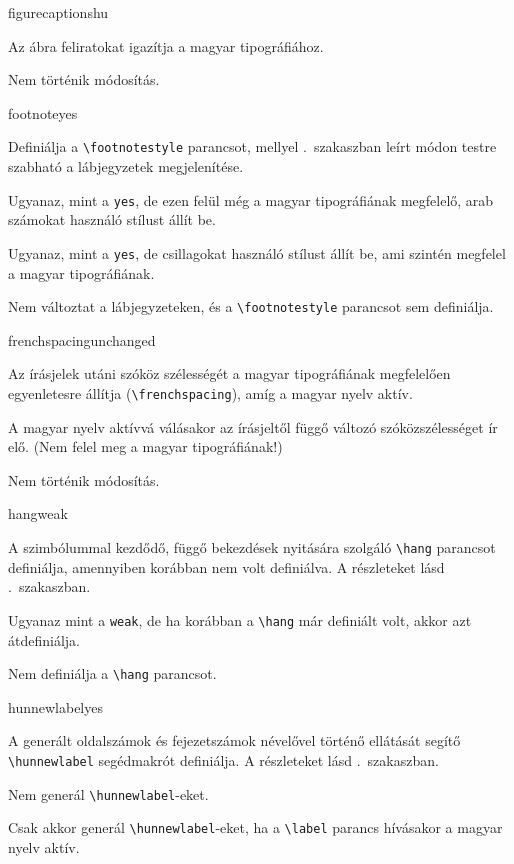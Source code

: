 \documentclass[12pt]{article}
\begin{document}
\begin{description}
\begin{hunopt}{figurecaptions}{hu}
\item[hu]
Az ábra feliratokat igazítja a magyar tipográfiához.
\item[unchanged]
Nem történik módosítás.
\end{hunopt}

\begin{hunopt}{footnote}{yes}
\item[yes]
Definiálja a \verb|\footnotestyle| parancsot, mellyel .~szakaszban leírt módon testre szabható a lábjegyzetek megjelenítése.
\item[huplain]
Ugyanaz, mint a \texttt{yes}, de ezen felül még a magyar tipográfiának megfelelő, arab számokat használó stílust állít be.
\item[starplain]
Ugyanaz, mint a \texttt{yes}, de csillagokat használó stílust állít be, ami szintén megfelel a magyar tipográfiának.
\item[unchanged]
Nem változtat a lábjegyzeteken, és a \verb|\footnotestyle| parancsot sem definiálja.
\end{hunopt}

\begin{hunopt}{frenchspacing}{unchanged}
\item[yes]
Az írásjelek utáni szóköz szélességét a magyar tipográfiának megfelelően egyenletesre állítja (\verb|\frenchspacing|), amíg a magyar nyelv aktív.
\item[no]
A magyar nyelv aktívvá válásakor az írásjeltől függő változó szóközszélességet ír elő. (Nem felel meg a magyar tipográfiának!)
\item[unchanged]
Nem történik módosítás.
\end{hunopt}

\begin{hunopt}{hang}{weak}
\item[weak]
A szimbólummal kezdődő, függő bekezdések nyitására szolgáló \verb|\hang| parancsot definiálja, amennyiben korábban nem volt definiálva.
A részleteket lásd .~szakaszban.
\item[yes]
Ugyanaz mint a \texttt{weak}, de ha korábban a \verb|\hang| már definiált volt, akkor azt átdefiniálja.
\item[no]
Nem definiálja a \verb|\hang| parancsot.
\end{hunopt}

\begin{hunopt}{hunnewlabel}{yes}
\item[yes]
A generált oldalszámok és fejezetszámok névelővel történő ellátását segítő \verb|\hunnewlabel| segédmakrót definiálja.
A részleteket lásd .~szakaszban.
\item[no]
Nem generál \verb|\hunnewlabel|-eket.
\item[only-hu]
Csak akkor generál \verb|\hunnewlabel|-eket, ha a \verb|\label| parancs hívásakor a magyar nyelv aktív.
\end{hunopt}


\end{description}
\end{document}
